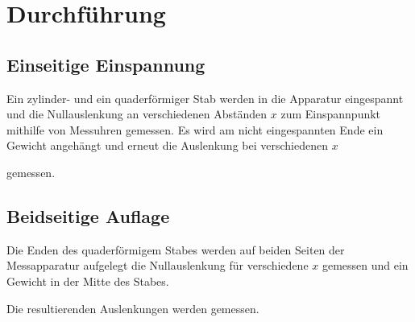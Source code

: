 \section{Durchführung}
\label{sec:Durchführung}

\subsection{Einseitige Einspannung}

Ein zylinder- und ein quaderförmiger Stab werden in die Apparatur eingespannt und die Nullauslenkung an verschiedenen Abständen $x$ zum Einspannpunkt mithilfe von Messuhren gemessen. Es wird am nicht eingespannten Ende ein Gewicht angehängt und erneut die Auslenkung bei verschiedenen $x$

gemessen.


\subsection{Beidseitige Auflage}

Die Enden des quaderförmigem Stabes werden auf beiden Seiten der Messapparatur aufgelegt die Nullauslenkung für verschiedene $x$ gemessen und ein Gewicht in der Mitte des Stabes.

Die resultierenden Auslenkungen werden gemessen.